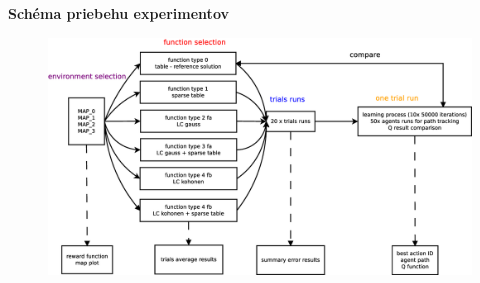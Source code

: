 \documentclass[xcolor=dvipsnames]{beamer}
\begin{document}
\begin{frame}{\bf Schéma priebehu experimentov}

\begin{figure}[!htb]
\centering
\includegraphics[scale=.22]{../diagrams/experiment_map_q_learning.eps}
\end{figure}

\end{frame}
\end{document}
